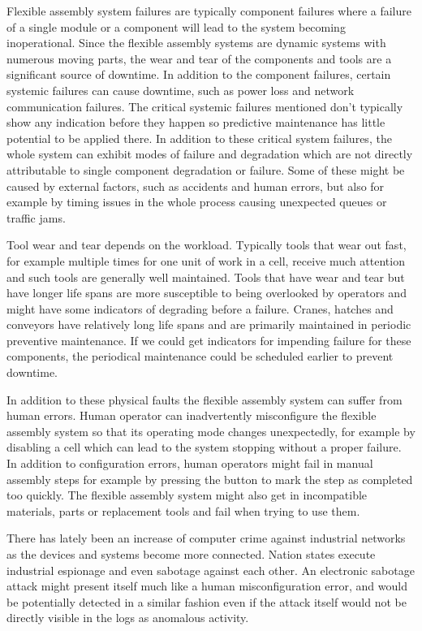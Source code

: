 \documentclass[journal]{IEEEtran}
\begin{document}
Flexible assembly system failures are typically component failures where a failure of a single module or a component will lead to the system becoming inoperational.
Since the flexible assembly systems are dynamic systems with numerous moving parts, the wear and tear of the components and tools are a significant source of downtime.
In addition to the component failures, certain systemic failures can cause downtime, such as power loss and network communication failures.
The critical systemic failures mentioned don't typically show any indication before they happen so predictive maintenance has little potential to be applied there.
In addition to these critical system failures,
the whole system can exhibit modes of failure and degradation which are not directly attributable to single component degradation or failure. Some of these might be caused by
external factors, such as accidents and human errors, but also for example by timing issues in the whole process causing unexpected queues or traffic jams.

Tool wear and tear depends on the workload. Typically tools that wear out fast, for example multiple times for one unit of work in a cell, receive much attention and such tools are generally
well maintained. Tools that have wear and tear but have longer life spans are more susceptible to being overlooked by operators and might have some indicators of degrading
before a failure. Cranes, hatches and conveyors have relatively long life spans and are primarily maintained in periodic preventive maintenance. If we could get indicators
for impending failure for these components, the periodical maintenance could be scheduled earlier to prevent downtime.

In addition to these physical faults the flexible
assembly system can suffer from human errors. Human operator can inadvertently misconfigure the flexible assembly system so that its operating mode changes unexpectedly,
for example by disabling a cell which can lead to the system stopping without a proper failure. In addition to configuration
errors, human operators might fail in manual assembly steps for example by pressing the button to mark the step
as completed too quickly.
The flexible assembly system might also get in incompatible materials, parts or replacement tools and fail when trying to use them.

There has lately been an increase of computer crime against industrial networks as the devices and systems become more connected.
Nation states execute industrial espionage and even sabotage against each other\cite{stuxnet}. An electronic sabotage attack might present itself
much like a human misconfiguration error, and would be potentially detected in a similar fashion even if the attack itself would not be
directly visible in the logs as anomalous activity.
\end{document}
